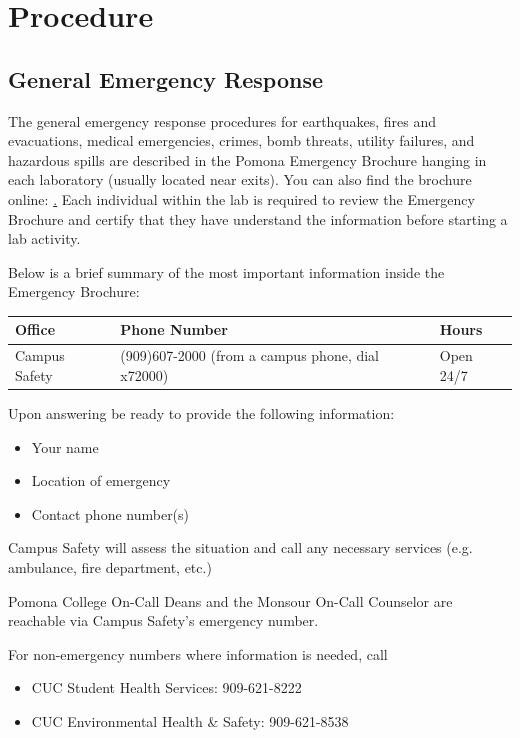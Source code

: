 \documentclass[12pt]{../SOP2}
\begin{document}
\section{Procedure}

\subsection*{General Emergency Response}

\NP The general emergency response procedures for earthquakes, fires and evacuations, medical emergencies, crimes, bomb threats, utility failures, and hazardous spills are described in the Pomona Emergency Brochure hanging in each laboratory (usually located near exits). You can also find the brochure online: \href{http://www.pomona.edu/sites/default/files/emergency-instructions.pdf}. Each individual within the lab is required to review the Emergency Brochure and certify that they have understand the information before starting a lab activity.

\NP Below is a brief summary of the most important information inside the Emergency Brochure: 

\begin{table}
\begin{tabular}{lll} \hline
Office            & Phone Number & Hours \\ \hline\hline
Campus Safety     & (909)607-2000 (from a campus phone, dial x72000) & Open 24/7 \\ \hline
\end{tabular}
\end{table}

\NP Upon answering be ready to provide the following information:

\begin{itemize}
  \item Your name
  \item Location of emergency
  \item Contact phone number(s)
\end{itemize}

\NP Campus Safety will assess the situation and call any necessary services (e.g. ambulance, fire department, etc.)

\NP Pomona College On-Call Deans and the Monsour On-Call Counselor are reachable via Campus Safety's emergency number. 

\NP For non-emergency numbers where information is needed, call 
 
\begin{itemize}
  \item CUC Student Health Services: 909-621-8222
  \item CUC Environmental Health \& Safety: 909-621-8538 
\end{itemize}
\end{document}
